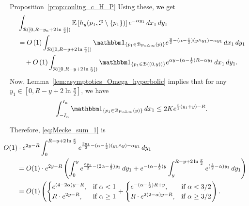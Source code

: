 \begin{proofof}{Proposition~\ref{prop:couling_c_H_P}}
Using these, we get
\begin{align} 
	&\int_{\Rcal ([0, R - y_n + 2 \ln \frac{\pi}{2}])} \Exp{h_y(p_1, \Pcal \setminus \{p_1\})} 
    e^{-\alpha y_1} \, dx_1 \, dy_1 \notag \\
	&= \bigO{1} \int_{\Rcal ([0, R - y+ 2 \ln \frac{\pi}{2}])} \ind{p_1 \in \BallSym{p}} 
		e^{\frac{y}{2} - (\alpha - \frac{1}{2}) (y \wedge y_1) - \alpha y_1} \, dx_1 \, dy_1
		\label{eq:Mecke_sum_1}\\ 
	&\hspace{10pt}+ \bigO{1} \int_{\Rcal ([0, R - y + 2 \ln \frac{\pi}{2}])} 
    	\ind{p_1 \in \BallHyp{(0,y)}} 
    	e^{\alpha y - (\alpha - \frac{1}{2})R - \alpha y_1} \, dx_1 \, dy_1.\label{eq:Mecke_sum_2}
\end{align}
Now, Lemma~\ref{lem:asymptotics_Omega_hyperbolic} implies that 
for any $y_1 \in [0, R - y + 2 \ln \frac{\pi}{2}]$, we have 
\[ 
	\int_{-I_n}^{I_n} \ind{p_1 \in \BallSym{y}} \, dx_1 \leq 2 K e^{\frac{3}{2} (y_1 + y) - R}.
\]

Therefore, \eqref{eq:Mecke_sum_1} is 
\begin{align*}
	&\hspace{-20pt}O(1) \cdot e^{2 y - R} \int_{0}^{R - y + 2 \ln \frac{\pi}{2}} 
    	e^{\frac{3y_1}{2} - (\alpha - \frac{1}{2})(y_1 \wedge y) - \alpha y_1} \, dy_1 \\
 	&=  O(1) \cdot e^{2 y - R} \left( \int_{0}^{y} e^{\frac{3y_1}{2} - (2\alpha - \frac{1}{2})y_1} \, dy_1 
 		+ e^{-(\alpha-\frac{1}{2}) y}\int_{y}^{R - y + 2 \ln \frac{\pi}{2}} e^{(\frac{3}{2} - \alpha) y_1} \, dy_1 \right)\\
  	&= O(1) \left( 
	\begin{cases}
	e^{(4-2\alpha) y - R}, & \mbox{if $\alpha < 1$} \\
	R \cdot e^{2y - R}, & \mbox{if $\alpha \geq 1$}
	\end{cases}
	+
	\begin{cases}
	e^{-(\alpha - \frac{1}{2})R +y}, & \mbox{if $\alpha < 3/2$} \\
	R \cdot  e^{2(2-\alpha)y - R}, & \mbox{if $\alpha \geq 3/2$}
	\end{cases}\right).
\end{align*}


\end{proofof}
